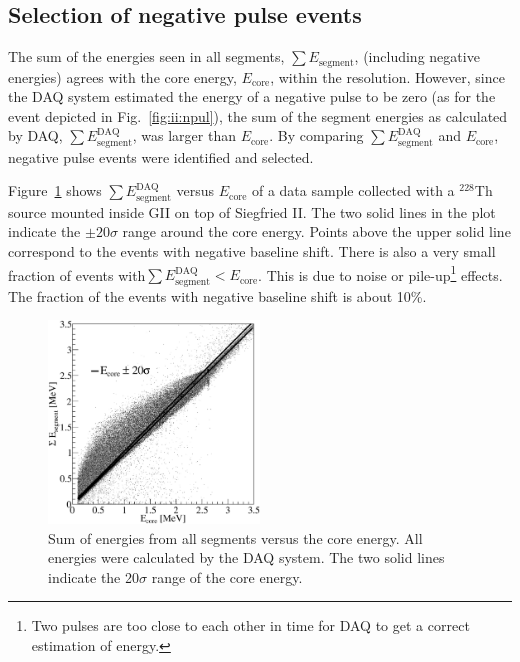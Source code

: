 \subsection{Selection of negative pulse events}
\label{sec:ii:frac}
The sum of the energies seen in all segments, $\sum E_{\text{segment}}$, (including negative energies) agrees with the core energy, $E_{\text{core}}$, within the resolution. However, since the DAQ system estimated the energy of a negative pulse to be zero (as for the event depicted in Fig.~\ref{fig:ii:npul}), the sum of the segment energies as calculated by DAQ, $\sum E^{\text{DAQ}}_{\text{segment}}$, was larger than $E_{\text{core}}$. By comparing  $\sum E^{\text{DAQ}}_{\text{segment}}$ and $E_{\text{core}}$, negative pulse events were identified and selected.

Figure~\ref{fig:ii:sEnegPulse} shows $\sum E^{\text{DAQ}}_{\text{segment}}$ versus $E_{\text{core}}$ of a data sample collected with a $^{228}$Th source mounted inside GII on top of Siegfried II. The two solid lines in the plot indicate the $\pm 20 \sigma$ range around the core energy. Points above the upper solid line correspond to the events with negative baseline shift. There is also a very small fraction of events with$\sum E^{\text{DAQ}}_{\text{segment}} < E_{\text{core}}$. This is due to noise or pile-up\footnote{Two pulses are too close to each other in time for DAQ to get a correct estimation of energy.} effects. The fraction of the events with negative baseline shift is about 10\%.

\begin{figure}[tphb]
\centering
\includegraphics[width=0.5\textwidth]{sEnegPuls}
\caption{Sum of energies from all segments versus the core energy. All energies were calculated by the DAQ system. The two solid lines indicate the 20$\sigma$ range of the core energy.}
\label{fig:ii:sEnegPulse}
\end{figure}

